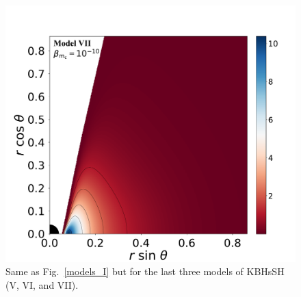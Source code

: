\documentclass[twocolumn,aps,showpacs,showkeys,prd,superscriptaddress,byrevtex, amsmath]{revtex4-1}
\begin{document}
\begin{figure}
\includegraphics[scale=0.14]{figures/fig2_VII__10.pdf}
\hspace{-0.2cm}
\caption{Same as Fig.~\ref{models_I} but for the last three models of KBHsSH (V, VI, and VII).}
\label{models_II}
\end{figure}
\end{document}
